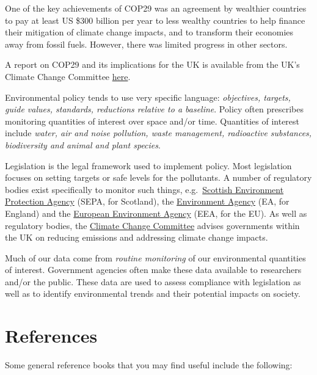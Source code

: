 \documentclass[
  letterpaper,
  DIV=11,
  numbers=noendperiod]{scrartcl}
\begin{document}
\begin{tcolorbox}
One of the key achievements of COP29 was an agreement by wealthier
countries to pay at least US \$300 billion per year to less wealthy
countries to help finance their mitigation of climate change impacts,
and to transform their economies away from fossil fuels. However, there
was limited progress in other sectors.

A report on COP29 and its implications for the UK is available from the
UK's Climate Change Committee
\href{https://www.theccc.org.uk/publication/cop29-key-outcomes-and-next-steps-for-the-uk/}{here}.

\end{tcolorbox}

Environmental policy tends to use very specific language:
\emph{objectives, targets, guide values, standards, reductions relative
to a baseline}. Policy often prescribes monitoring quantities of
interest over space and/or time. Quantities of interest include
\emph{water, air and noise pollution, waste management, radioactive
substances, biodiversity and animal and plant species}.

Legislation is the legal framework used to implement policy. Most
legislation focuses on setting targets or safe levels for the
pollutants. A number of regulatory bodies exist specifically to monitor
such things,
e.g.~\href{https://beta.sepa.scot/about-sepa/who-we-are/}{Scottish
Environment Protection Agency} (SEPA, for Scotland), the
\href{https://www.gov.uk/government/organisations/environment-agency/about}{Environment
Agency} (EA, for England) and the
\href{https://www.eea.europa.eu/en}{European Environment Agency} (EEA,
for the EU). As well as regulatory bodies, the
\href{https://www.theccc.org.uk/about/}{Climate Change Committee}
advises governments within the UK on reducing emissions and addressing
climate change impacts.

Much of our data come from \emph{routine monitoring} of our
environmental quantities of interest. Government agencies often make
these data available to researchers and/or the public. These data are
used to assess compliance with legislation as well as to identify
environmental trends and their potential impacts on society.

\section*{References}\label{references}

Some general reference books that you may find useful include the
following:
\end{document}
